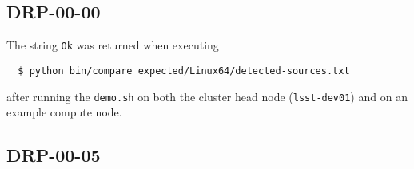 \documentclass[DM,lsstdraft,STR,toc]{lsstdoc}
\begin{document}
\subsection{DRP-00-00}

The string \texttt{Ok} was returned when executing

\begin{verbatim}
  $ python bin/compare expected/Linux64/detected-sources.txt
\end{verbatim}

after running the \texttt{demo.sh} on both the cluster head node (\texttt{lsst-dev01}) and on an example compute node.


\subsection{DRP-00-05}
\end{document}
